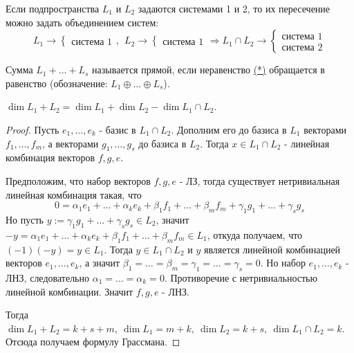 Если подпространства $L_1$ и $L_2$ задаются системами 1 и 2, то их пересечение можно задать объединением систем:
\[
L_1 \rightarrow 
\left\{
\begin{array}{ll}
\text{система 1}
\end{array}
\right.
, \ \ 
L_2 \rightarrow 
\left\{
\begin{array}{ll}
\text{система 1}
\end{array}
\right.
\Rightarrow 
L_1 \cap L_2 \rightarrow 
\left\{
\begin{array}{ll}
\text{система 1}
\\
\text{система 2}
\end{array}
\right.
\]
\begin{definition}
    Сумма $L_1+\dots +L_s$ называется прямой, если неравенство \hyperref[dim_inequality]{(*)} обращается в равенство (обозначение: $L_1 \oplus \dots \oplus L_s$).
\end{definition}
\begin{theorem} 
    $\dim{L_1+L_2}=\dim{L_1}+\dim{L_2}-\dim{L_1\cap L_2}$.
\end{theorem}
\begin{proof}
    Пусть $e_1, \dots, e_k$ - базис в $L_1 \cap L_2$. Дополним его до базиса в $L_1$ векторами $f_1, \dots, f_m$, а векторами $g_1, \dots, g_s$ до базиса в $L_2$. Тогда $x\in L_1 \cap L_2$ - линейная комбинация векторов $f, g, e$.

    Предположим, что набор векторов $f, g, e$ - ЛЗ, тогда существует нетривиальная линейная комбинация такая, что 
    \[
    0=\alpha_1 e_1 + \dots + \alpha_k e_k + \beta_1 f_1 +\dots+\beta_m f_m + \gamma_1 g_1 + \dots + \gamma_s g_s
    \]
    Но пусть $y:=\gamma_1 g_1 + \dots + \gamma_s g_s \in L_2$, значит $-y=\alpha_1 e_1 + \dots + \alpha_k e_k + \beta_1 f_1 +\dots+\beta_m f_m \in L_1$, откуда получаем, что $(-1)(-y)=y\in L_1$. Тогда $y \in L_1 \cap L_2$ и $y$ является линейной комбинацией векторов $e_1, \dots, e_k$, а значит $\beta_1=\dots=\beta_m=\gamma_1=\dots=\gamma_s=0$. Но набор $e_1, \dots, e_k$ - ЛНЗ, следовательно $\alpha_1=\dots = \alpha_k=0$. Противоречие с нетривиальностью линейной комбинации. Значит $f, g, e$ - ЛНЗ.

    Тогда $\dim L_1+L_2 =k+s+m, \ \dim L_1= m+k, \ \dim L_2=k+s, \ \dim L_1 \cap L_2=k$. Отсюда получаем формулу Грассмана.
\end{proof}

